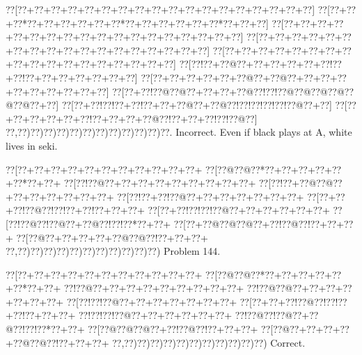 \documentclass[a5paper]{article}
\begin{document}
\begin{center}
{\goo
\0??[\0??+\0??+\0??+\0??+\0??+\0??+\0??+\0??+\0??+\0??+\0??+\0??+\0??+\0??+\0??+\0??+\0??+\0??]
\0??[\0??+\0??+\0??*\0??+\0??+\0??+\0??+\0??+\0??*\0??+\0??+\0??+\0??+\0??+\0??*\0??+\0??+\0??]
\0??[\0??+\0??+\0??+\0??+\0??+\0??+\0??+\0??+\0??+\0??+\0??+\0??+\0??+\0??+\0??+\0??+\0??+\0??]
\0??[\0??+\0??+\0??+\0??+\0??+\0??+\0??+\0??+\0??+\0??+\0??+\0??+\0??+\0??+\0??+\0??+\0??+\0??]
\0??[\0??+\0??+\0??+\0??+\0??+\0??+\0??+\0??+\0??+\0??+\0??+\0??+\0??+\0??+\0??+\0??+\0??+\0??]
\0??[\0??!\0??+\0??@\0??+\0??+\0??+\0??+\0??+\0??!\0??+\0??!\0??+\0??+\0??+\0??+\0??+\0??+\0??]
\0??[\0??+\0??+\0??+\0??+\0??+\0??@\0??+\0??@\0??+\0??+\0??+\0??+\0??+\0??+\0??+\0??+\0??+\0??]
\0??[\0??+\0??!\0??@\0??@\0??+\0??+\0??+\0??@\0??!\0??!\0??@\0??@\0??@\0??@\0??@\0??@\0??+\0??]
\0??[\0??+\0??!\0??!\0??+\0??!\0??+\0??+\0??@\0??+\0??@\0??!\0??!\0??!\0??!\0??!\0??@\0??+\0??]
\0??[\0??+\0??+\0??+\0??+\0??+\0??!\0??+\0??+\0??+\0??@\0??!\0??+\0??+\0??!\0??!\0??@\0??]
\0??,\0??)\0??)\0??)\0??)\0??)\0??)\0??)\0??)\0??)\0??)\0??)\0??.
}
Incorrect. Even if black plays at A, white lives in seki.

\end{center}
\newpage
\begin{center}
{\goo
\0??[\0??+\0??+\0??+\0??+\0??+\0??+\0??+\0??+\0??+\0??+\0??+
\0??[\0??@\0??@\0??*\0??+\0??+\0??+\0??+\0??+\0??*\0??+\0??+
\0??[\0??!\0??@\0??+\0??+\0??+\0??+\0??+\0??+\0??+\0??+\0??+
\0??[\0??!\0??+\0??@\0??@\0??+\0??+\0??+\0??+\0??+\0??+\0??+
\0??[\0??!\0??+\0??!\0??@\0??+\0??+\0??+\0??+\0??+\0??+\0??+
\0??[\0??+\0??+\0??!\0??@\0??!\0??!\0??+\0??!\0??+\0??+\0??+
\0??[\0??+\0??!\0??!\0??!\0??@\0??+\0??+\0??+\0??+\0??+\0??+
\0??[\0??!\0??@\0??!\0??@\0??+\0??@\0??!\0??!\0??*\0??+\0??+
\0??[\0??+\0??@\0??@\0??@\0??+\0??!\0??@\0??!\0??+\0??+\0??+
\0??[\0??@\0??+\0??+\0??+\0??+\0??@\0??@\0??!\0??+\0??+\0??+
\0??,\0??)\0??)\0??)\0??)\0??)\0??)\0??)\0??)\0??)\0??)\0??)
}
Problem 144.

\end{center}
\begin{center}
{\goo
\0??[\0??+\0??+\0??+\0??+\0??+\0??+\0??+\0??+\0??+\0??+\0??+
\0??[\0??@\0??@\0??*\0??+\0??+\0??+\0??+\0??+\0??*\0??+\0??+
\0??!\0??@\0??+\0??+\0??+\0??+\0??+\0??+\0??+\0??+\0??+
\0??!\0??@\0??@\0??+\0??+\0??+\0??+\0??+\0??+\0??+
\0??[\0??!\0??!\0??@\0??+\0??+\0??+\0??+\0??+\0??+\0??+
\0??[\0??+\0??+\0??!\0??@\0??!\0??!\0??+\0??!\0??+\0??+\0??+
\0??!\0??!\0??!\0??@\0??+\0??+\0??+\0??+\0??+\0??+
\0??!\0??@\0??!\0??@\0??+\0??@\0??!\0??!\0??*\0??+\0??+
\0??[\0??@\0??@\0??@\0??+\0??!\0??@\0??!\0??+\0??+\0??+
\0??[\0??@\0??+\0??+\0??+\0??+\0??@\0??@\0??!\0??+\0??+\0??+
\0??,\0??)\0??)\0??)\0??)\0??)\0??)\0??)\0??)\0??)\0??)\0??)
}
Correct. 

\end{center}
\end{document}
